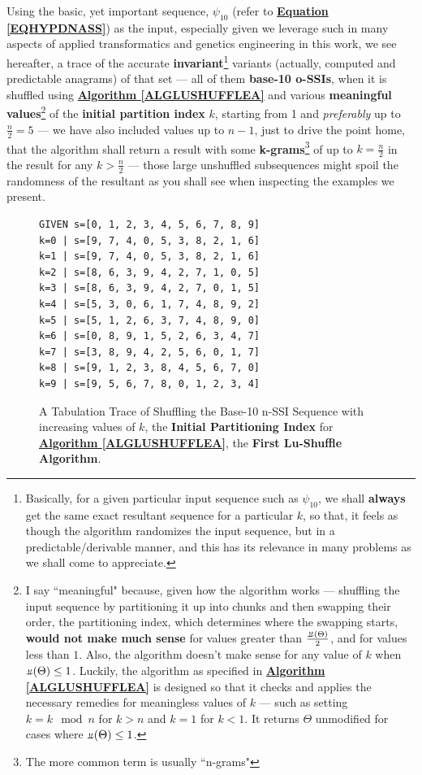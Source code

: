 \documentclass[a4paper, 18pt]{book} %
\newcommand{\invpi}{\rotatebox[origin=c]{180}{$\pi$}}
\begin{document}
Using the basic, yet important sequence, $\psi_{10}$ (refer to \textbf{\hyperref[EQHYPDNASS]{Equation \ref{EQHYPDNASS}}}) as the input, especially given we leverage such in many aspects of applied transformatics and genetics engineering in this work, we see hereafter, a trace of the accurate \textbf{invariant}\footnote{Basically, for a given particular input sequence such as $\psi_{10}$, we shall \textbf{always} get the same exact resultant sequence for a particular $k$, so that, it feels as though the algorithm randomizes the input sequence, but in a predictable/derivable manner, and this has its relevance in many problems as we shall come to appreciate.} variants (actually, computed and predictable anagrams) of that set --- all of them \textbf{base-10 o-SSIs}\cite{ossipaper}, when it is shuffled using \textbf{\hyperref[ALGLUSHUFFLEA]{Algorithm \ref{ALGLUSHUFFLEA}}} and various \textbf{meaningful values}\footnote{I say ``meaningful" because, given how the algorithm works --- shuffling the input sequence by partitioning it up into chunks and then swapping their order, the partitioning index, which determines where the swapping starts, \textbf{would not make much sense} for values greater than $\frac{\invpi(\Theta)}{2}$, and for values less than $1$. Also, the algorithm doesn't make sense for any value of $k$ when $\invpi(\Theta) \leq 1$. Luckily, the algorithm as specified in \textbf{\hyperref[ALGLUSHUFFLEA]{Algorithm \ref{ALGLUSHUFFLEA}}} is designed so that it checks and applies the necessary remedies for meaningless values of $k$ --- such as setting $k = k \mod n$ for $k > n$ and $k=1$ for $k < 1$. It returns $\Theta$ unmodified for cases where $\invpi(\Theta) \leq 1$.} of the \textbf{initial partition index} $k$, starting from 1 and \textit{preferably} up to $\frac{n}{2} = 5$ --- we have also included values up to $n-1$, just to drive the point home, that the algorithm shall return a result with some \textbf{k-grams}\footnote{The more common term is usually ``n-grams"} of up to $k = \frac{n}{2}$ in the result for any $k > \frac{n}{2}$ --- those large unshuffled subsequences might spoil the randomness of the resultant as you shall see when inspecting the examples we present. 

\begin{figure}[H]
  \begin{center}
\LARGE
\begin{verbatim}
GIVEN s=[0, 1, 2, 3, 4, 5, 6, 7, 8, 9]
k=0 | s=[9, 7, 4, 0, 5, 3, 8, 2, 1, 6]
k=1 | s=[9, 7, 4, 0, 5, 3, 8, 2, 1, 6]
k=2 | s=[8, 6, 3, 9, 4, 2, 7, 1, 0, 5]
k=3 | s=[8, 6, 3, 9, 4, 2, 7, 0, 1, 5]
k=4 | s=[5, 3, 0, 6, 1, 7, 4, 8, 9, 2]
k=5 | s=[5, 1, 2, 6, 3, 7, 4, 8, 9, 0]
k=6 | s=[0, 8, 9, 1, 5, 2, 6, 3, 4, 7]
k=7 | s=[3, 8, 9, 4, 2, 5, 6, 0, 1, 7]
k=8 | s=[9, 1, 2, 3, 8, 4, 5, 6, 7, 0]
k=9 | s=[9, 5, 6, 7, 8, 0, 1, 2, 3, 4]
\end{verbatim}

   \caption{A Tabulation Trace of Shuffling the Base-10 n-SSI Sequence with increasing values of $k$, the \textbf{Initial Partitioning Index} for \textbf{\hyperref[ALGLUSHUFFLEA]{Algorithm \ref{ALGLUSHUFFLEA}}}, the \textbf{First Lu-Shuffle Algorithm}.}
  \label{FIGTRACEFLSA}
  \end{center}
\end{figure}
\end{document}

